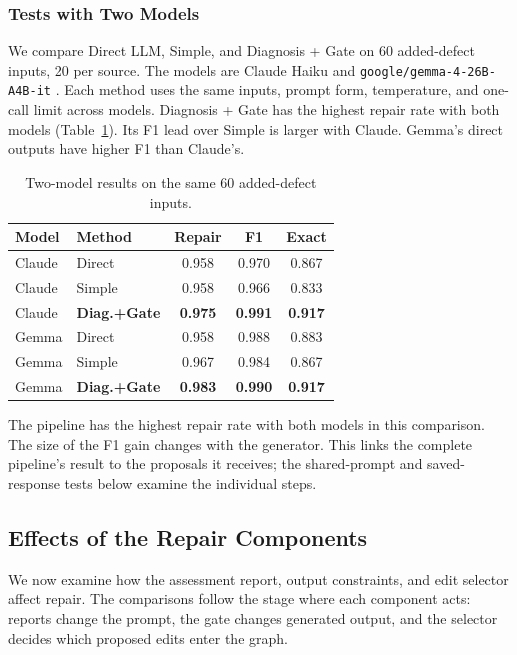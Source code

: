 \subsubsection{Tests with Two Models}
\label{sec:eval:crossmodel}

We compare Direct LLM, Simple, and Diagnosis + Gate on 60 added-defect
inputs, 20 per source. The models are Claude Haiku and
\texttt{google/gemma-4-26B-A4B-it} \citep{ref_gemma4}.
Each method uses the same inputs, prompt form, temperature, and one-call
limit across models. Diagnosis + Gate has the highest repair rate with
both models (Table~\ref{tab:cross_model}). Its F1 lead over Simple is larger
with Claude. Gemma's direct outputs have higher F1 than Claude's.

\begin{table}[t]
\centering
\caption{Two-model results on the same 60 added-defect inputs.}
\label{tab:cross_model}
\small
\begin{tabular}{l l c c c}
\toprule
Model & Method & Repair & F1 & Exact \\
\midrule
Claude & Direct & 0.958 & 0.970 & 0.867 \\
Claude & Simple & 0.958 & 0.966 & 0.833 \\
Claude & \textbf{Diag.+Gate} & \textbf{0.975} & \textbf{0.991} & \textbf{0.917} \\
\midrule
Gemma & Direct & 0.958 & 0.988 & 0.883 \\
Gemma & Simple & 0.967 & 0.984 & 0.867 \\
Gemma & \textbf{Diag.+Gate} & \textbf{0.983} & \textbf{0.990} & \textbf{0.917} \\
\bottomrule
\end{tabular}
\end{table}

The pipeline has the highest repair rate with both models in this comparison.
The size of the F1 gain changes with the generator.
This links the complete pipeline's result to the proposals it receives;
the shared-prompt and saved-response tests below examine the individual steps.

\subsection{Effects of the Repair Components}
\label{sec:eval:router}
\label{sec:eval:mechanisms}

We now examine how the assessment report, output constraints, and edit
selector affect repair. The comparisons follow the stage where each
component acts: reports change the prompt, the gate changes generated
output, and the selector decides which proposed edits enter the graph.

